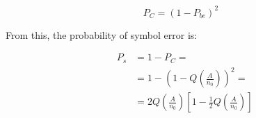 \begin{equation}
P_C = (1 - P_{be})^2
\end{equation}

From this, the probability of symbol error is:

\begin{eqnarray}
&P_s &= 1-P_C =\nonumber \\
&	   &= 1 - \left(1 - Q \left({\frac{A}{n_0}}\right)\right)^2 = \nonumber \\
&	   &= 2 Q\left({\frac{A}{n_0}}\right)\left[1-\frac{1}{2} Q \left({\frac{A}{n_0}}\right)\right]
\end{eqnarray}





%
%
%
%
%


